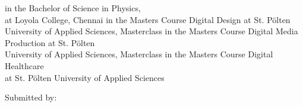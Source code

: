 \begin{center}
\ifUseMasterInteractiveTechnologies
	in the Bachelor of Science in Physics, \\ at Loyola College, Chennai %
\else
    \ifUseMasterDigitalDesign
	in the Masters Course Digital Design at St. Pölten\\ 
University of Applied Sciences, Masterclass \specialization
\else
    \ifUseMasterDigitalMediaProduction
	in the Masters Course Digital Media Production at St. Pölten\\ 
University of Applied Sciences, Masterclass \specialization
\else
	\ifUseMasterDigitalHealthCare
		in the Masters Course Digital Healthcare\\ 
at St. Pölten University of Applied Sciences
    \else
  	\fi
\fi\fi\fi





\vspace{1cm}

Submitted by:\\ 
\fontsize{15pt}{15pt}\selectfont
\textbf{\studentFirstName\ \studentLastName} \\
\fontsize{11pt}{15pt}\selectfont
\studentId


\end{center}
